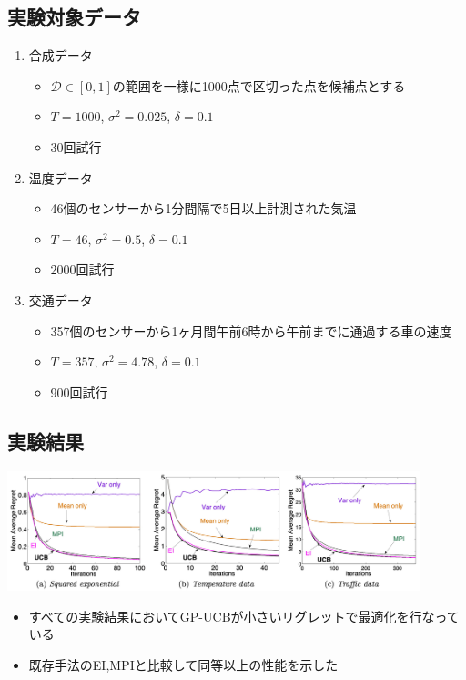 \documentclass[dvipdfmx, 10.5pt]{beamer}
\begin{document}
\subsection{実験対象データ}
\begin{frame}{\insertsubsection}
	\begin{enumerate}
		\item 合成データ
		\begin{itemize}
			\item $\mathcal{D} \in [0,1]$の範囲を一様に1000点で区切った点を候補点とする
			\item $T = 1000$, $\sigma^2 = 0.025$, $\delta = 0.1$
			\item 30回試行
		\end{itemize}
		\vspace{5pt}
		\item 温度データ
		\begin{itemize}
			\item 46個のセンサーから1分間隔で5日以上計測された気温
			\item $T = 46$, $\sigma^2 = 0.5$, $\delta = 0.1$
			\item 2000回試行
		\end{itemize}
		\vspace{5pt}
		\item 交通データ
		\begin{itemize}
			\item 357個のセンサーから1ヶ月間午前6時から午前までに通過する車の速度
			\item $T = 357$, $\sigma^2 = 4.78$, $\delta = 0.1$
			\item 900回試行
		\end{itemize}
	\end{enumerate}
\end{frame}


\subsection{実験結果}

\begin{frame}{\insertsubsection}
	\begin{center}
		\includegraphics[width=0.90\textwidth]{./Fig/Figure4.pdf}
	\end{center}
	\begin{itemize}
		\item すべての実験結果においてGP-UCBが小さいリグレットで最適化を行なっている
		\item \textcolor{myorange}{既存手法のEI,MPIと比較して同等以上の性能を示した}
	\end{itemize}

\end{frame}
\end{document}
